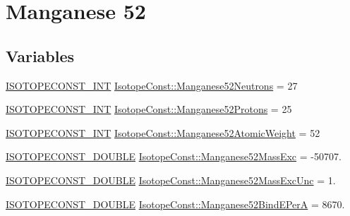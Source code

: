 \hypertarget{group___isotope_const-_manganese-_mn52}{}\section{Manganese 52}
\label{group___isotope_const-_manganese-_mn52}
\subsection*{Variables}
\begin{DoxyCompactItemize}
\item 
\mbox{\hyperlink{group___isotope_const-_macros_ga5f18360b3e99483a35c32d789e62621c}{I\+S\+O\+T\+O\+P\+E\+C\+O\+N\+S\+T\+\_\+\+I\+NT}} \mbox{\hyperlink{group___isotope_const-_manganese-_mn52_gad426638b54bfae6fd799acc88682e50a}{Isotope\+Const\+::\+Manganese52\+Neutrons}} = 27
\item 
\mbox{\hyperlink{group___isotope_const-_macros_ga5f18360b3e99483a35c32d789e62621c}{I\+S\+O\+T\+O\+P\+E\+C\+O\+N\+S\+T\+\_\+\+I\+NT}} \mbox{\hyperlink{group___isotope_const-_manganese-_mn52_ga19b4bf74e77a53d3f5d46bc06667ed99}{Isotope\+Const\+::\+Manganese52\+Protons}} = 25
\item 
\mbox{\hyperlink{group___isotope_const-_macros_ga5f18360b3e99483a35c32d789e62621c}{I\+S\+O\+T\+O\+P\+E\+C\+O\+N\+S\+T\+\_\+\+I\+NT}} \mbox{\hyperlink{group___isotope_const-_manganese-_mn52_ga1a76f78f9114ff2bddeec8eb70148477}{Isotope\+Const\+::\+Manganese52\+Atomic\+Weight}} = 52
\item 
\mbox{\hyperlink{group___isotope_const-_macros_ga8f45a7272ce02c0b4c65c44636ed719a}{I\+S\+O\+T\+O\+P\+E\+C\+O\+N\+S\+T\+\_\+\+D\+O\+U\+B\+LE}} \mbox{\hyperlink{group___isotope_const-_manganese-_mn52_ga878b6ae7fc3ab793e0532a4e51edf019}{Isotope\+Const\+::\+Manganese52\+Mass\+Exc}} = -\/50707.
\item 
\mbox{\hyperlink{group___isotope_const-_macros_ga8f45a7272ce02c0b4c65c44636ed719a}{I\+S\+O\+T\+O\+P\+E\+C\+O\+N\+S\+T\+\_\+\+D\+O\+U\+B\+LE}} \mbox{\hyperlink{group___isotope_const-_manganese-_mn52_ga5441f0eb5629cc3e1736b6664cc11ac4}{Isotope\+Const\+::\+Manganese52\+Mass\+Exc\+Unc}} = 1.
\item 
\mbox{\hyperlink{group___isotope_const-_macros_ga8f45a7272ce02c0b4c65c44636ed719a}{I\+S\+O\+T\+O\+P\+E\+C\+O\+N\+S\+T\+\_\+\+D\+O\+U\+B\+LE}} \mbox{\hyperlink{group___isotope_const-_manganese-_mn52_ga28895f9923fd8b0c6c85eac50f1c2574}{Isotope\+Const\+::\+Manganese52\+Bind\+E\+PerA}} = 8670.
\item 

\end{DoxyCompactItemize}
